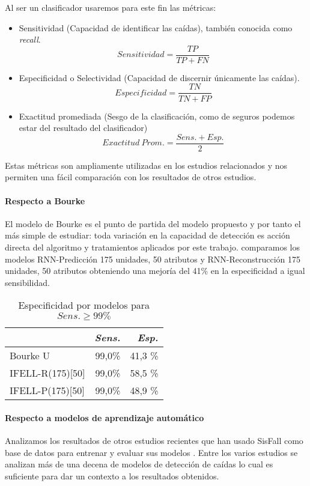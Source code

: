 \documentclass[11pt,a4paper,spanish,twocolumn]{article}
\begin{document}
Al ser un clasificador usaremos para este fin las métricas:
\begin{itemize}
  \item Sensitividad (Capacidad de identificar las caídas), también conocida como \textit{recall}.
  \[
    Sensitividad = \frac{TP}{TP+FN}
  \]
  \item Especificidad o Selectividad (Capacidad de discernir únicamente las caídas).
  \[
    Especificidad = \frac{TN}{TN+FP}
  \]
\item Exactitud promediada (Sesgo de la clasificación, como de seguros podemos estar del resultado del clasificador)
  \[
  Exactitud~Prom.=\frac{Sens.+Esp.}{2}
  \]
\end{itemize}
Estas métricas son ampliamente utilizadas en los estudios relacionados \cite{Noury2007} y nos permiten una fácil comparación con los resultados de otros estudios. 

\paragraph{Respecto a Bourke}
El modelo de Bourke es el punto de partida del modelo propuesto y por tanto el más simple de estudiar: toda variación en la capacidad de detección es acción directa del algoritmo y tratamientos aplicados por este trabajo. comparamos los modelos RNN-Predicción 175 unidades, 50 atributos y RNN-Reconstrucción 175 unidades, 50 atributos obteniendo una mejoría del 41\% en la especificidad a igual sensibilidad.

\begin{table}\caption{\label{tab:ifell:vs:bourke} Especificidad por modelos para $Sens. \geq 99\%$}
  \begin{tabular}{lrr}
  \tablas{lrr}{\toprule
    \emph{Modelo}     & \emph{Sens.} & \emph{Esp.} \\\midrule
    Bourke U          & 99,0\%    & 41,3 \% \\                
    IFELL-R(175)[50]    & 99,0\%  & 58,5 \% \\
    IFELL-P(175)[50]    & 99,0\%  & 48,9 \% \\\bottomrule
  \end{tabular}
\end{table}

\paragraph{Respecto a modelos de aprendizaje automático}
Analizamos los resultados de otros estudios recientes que han usado SisFall como base de datos para entrenar y evaluar sus modelos \cite{Torti2018,Liu2018,Liu2020,Musci2020}. Entre los varios estudios se analizan más de una decena de modelos de detección de caídas lo cual es suficiente para dar un contexto a los resultados obtenidos. 
\end{document}
